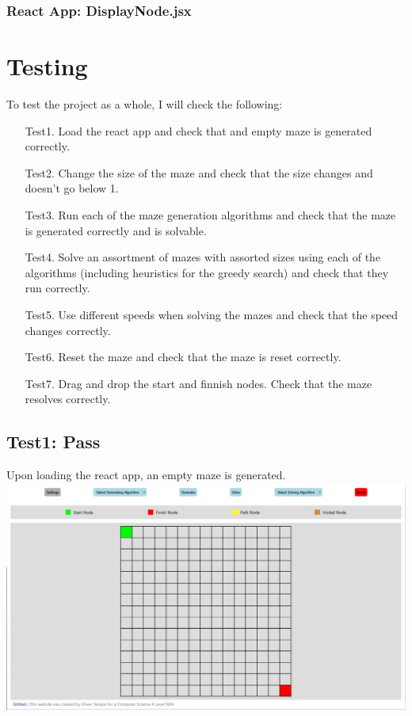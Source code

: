 \documentclass{article}
\begin{document}
\subsubsection{React App: DisplayNode.jsx}


\section{Testing}
To test the project as a whole, I will check the following:
\begin{enumerate}
    \item[Test1.] Load the react app and check that and empty maze is generated correctly.
    \item[Test2.] Change the size of the maze and check that the size changes and doesn't go below 1.
    \item[Test3.] Run each of the maze generation algorithms and check that the maze is generated correctly and is solvable.
    \item[Test4.] Solve an assortment of mazes with assorted sizes using each of the algorithms (including heuristics for the greedy search) and check that they run correctly.
    \item[Test5.] Use different speeds when solving the mazes and check that the speed changes correctly.
    \item[Test6.] Reset the maze and check that the maze is reset correctly.
    \item[Test7.] Drag and drop the start and finnish nodes. Check that the maze resolves correctly. 
\end{enumerate}

\subsection{Test1: Pass}
Upon loading the react app, an empty maze is generated.
\newline
\includegraphics[width=\linewidth]{assets/testing/test1.jpg}
\end{document}
